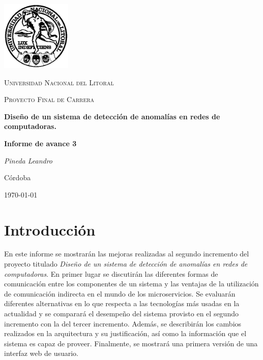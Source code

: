 \documentclass[a4paper,10pt, oneside]{article}
\begin{document}
	
\begin{titlepage}
	\centering
	\includegraphics[width=0.25\textwidth]{../../Universidad_del_Litoral}\par\vspace{1cm}
	{\scshape\LARGE Universidad Nacional del Litoral \par}
	\vspace{1cm}
	{\scshape\Large Proyecto Final de Carrera\par}
	\vspace{1.5cm}
	{\huge\bfseries Diseño de un sistema de detección de anomalías en redes de computadoras.\par}
	\vspace{4cm}
	{\huge\bfseries Informe de avance 3\par}
	\vfill
	
	{\Large \itshape Pineda Leandro\par}
	
	
	\large Córdoba\par
	{\large \today\par}	
\end{titlepage}

\modulolinenumbers[5]
\linenumbers

\section{Introducción}
En este informe se mostrarán las mejoras realizadas al segundo incremento del proyecto titulado \textit{Diseño de un sistema de detección de anomalías en redes de computadoras}. En primer lugar se discutirán las diferentes formas de comunicación entre los componentes de un sistema y las ventajas de la utilización de comunicación indirecta en el mundo de los microservicios. Se evaluarán diferentes alternativas en lo que respecta a las tecnologías más usadas en la actualidad y se comparará el desempeño del sistema provisto en el segundo incremento con la del tercer incremento. Además, se describirán los cambios realizados en la arquitectura y su justificación, así como la información que el sistema es capaz de proveer. Finalmente, se mostrará una primera versión de una interfaz web de usuario.
\newpage
\end{document}

